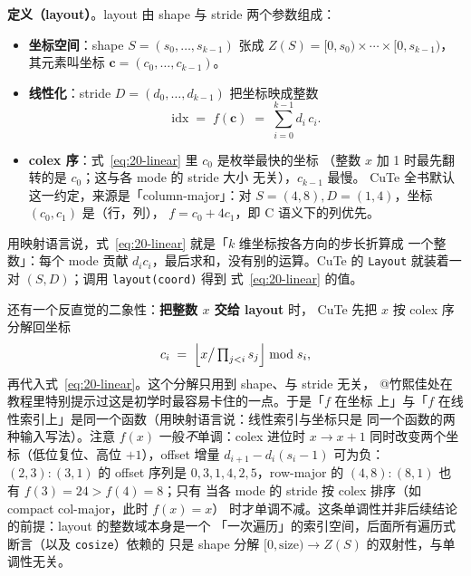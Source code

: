 \textbf{定义（layout）}。layout 由 shape 与 stride 两个参数组成：

\begin{itemize}
  \item \textbf{坐标空间}：shape $S=(s_0,\dots,s_{k-1})$ 张成
        $Z(S) = [0,s_0)\times\cdots\times[0,s_{k-1})$，其元素叫坐标
        $\mathbf{c}=(c_0,\dots,c_{k-1})$。
  \item \textbf{线性化}：stride $D=(d_0,\dots,d_{k-1})$ 把坐标映成整数
        \begin{equation}
          \mathrm{idx} \;=\; f(\mathbf{c}) \;=\; \sum_{i=0}^{k-1} d_i\,c_i .
          \label{eq:20-linear}
        \end{equation}
  \item \textbf{colex 序}：式~\eqref{eq:20-linear} 里 $c_0$ 是枚举最快的坐标
        （整数 $x$ 加 1 时最先翻转的是 $c_0$；这与各 mode 的 stride 大小
        无关），$c_{k-1}$ 最慢。
        CuTe 全书默认这一约定，来源是「column-major」：对
        $S=(4,8),D=(1,4)$，坐标 $(c_0,c_1)$ 是（行，列），
        $f=c_0+4c_1$，即 C 语义下的列优先。
\end{itemize}

用映射语言说，式~\eqref{eq:20-linear} 就是「$k$ 维坐标按各方向的步长折算成
一个整数」：每个 mode 贡献 $d_i c_i$，最后求和，没有别的运算。CuTe 的
\texttt{Layout} 就装着一对 $(S,D)$；调用 \texttt{layout\allowbreak{}(coord)} 得到
式~\eqref{eq:20-linear} 的值。

还有一个反直觉的二象性：\textbf{把整数 $x$ 交给 layout} 时，
CuTe 先把 $x$ 按 colex 序分解回坐标
\begin{equation}
  c_i \;=\; \Bigl\lfloor x \big/ \textstyle\prod_{j<i} s_j \Bigr\rfloor
  \bmod s_i ,
  \label{eq:20-colex-decomp}
\end{equation}
再代入式~\eqref{eq:20-linear}。这个分解只用到 shape、与 stride 无关，
@竹熙佳处在教程里特别提示过这是初学时最容易卡住的一点。于是「$f$ 在坐标
上」与「$f$ 在线性索引上」是同一个函数（用映射语言说：线性索引与坐标只是
同一个函数的两种输入写法）。注意 $f(x)$ 一般\emph{不}单调：colex 进位时
$x\to x+1$ 同时改变两个坐标（低位复位、高位 $+1$），offset 增量
$d_{i+1}-d_i(s_i-1)$ 可为负：$(2,3){:}(3,1)$ 的 offset 序列是
$0,3,1,4,2,5$，row-major 的 $(4,8){:}(8,1)$ 也有 $f(3)=24>f(4)=8$；只有
当各 mode 的 stride 按 colex 排序（如 compact col-major，此时 $f(x)=x$）
时才单调不减。这条单调性并非后续结论的前提：layout 的整数域本身是一个
「一次遍历」的索引空间，后面所有遍历式断言（以及 \texttt{cosize}）依赖的
只是 shape 分解 $[0,\mathrm{size})\to Z(S)$ 的双射性，与单调性无关。

